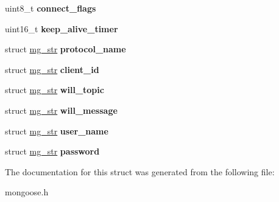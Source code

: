 \begin{DoxyCompactItemize}
uint8\+\_\+t {\bfseries connect\+\_\+flags}
\item 
\mbox{\label{structmg__mqtt__message_a79e6436df92ae92c88cd99150c27f8c7}} 
uint16\+\_\+t {\bfseries keep\+\_\+alive\+\_\+timer}
\item 
\mbox{\label{structmg__mqtt__message_ae908f614c1a210234df403fe9148d229}} 
struct \hyperlink{structmg__str}{mg\+\_\+str} {\bfseries protocol\+\_\+name}
\item 
\mbox{\label{structmg__mqtt__message_aa737e24d88a034c481cffdd207c6cb1a}} 
struct \hyperlink{structmg__str}{mg\+\_\+str} {\bfseries client\+\_\+id}
\item 
\mbox{\label{structmg__mqtt__message_a445cb051eb2301102a74561590614322}} 
struct \hyperlink{structmg__str}{mg\+\_\+str} {\bfseries will\+\_\+topic}
\item 
\mbox{\label{structmg__mqtt__message_abf358db60e5a092bd71a52a2dc9d02c7}} 
struct \hyperlink{structmg__str}{mg\+\_\+str} {\bfseries will\+\_\+message}
\item 
\mbox{\label{structmg__mqtt__message_a85ab9fb52ea0d8f353dcc09e285516c7}} 
struct \hyperlink{structmg__str}{mg\+\_\+str} {\bfseries user\+\_\+name}
\item 
\mbox{\label{structmg__mqtt__message_a9b8cee8acf7b16eed78f29b08d792229}} 
struct \hyperlink{structmg__str}{mg\+\_\+str} {\bfseries password}
\end{DoxyCompactItemize}


The documentation for this struct was generated from the following file\+:\begin{DoxyCompactItemize}
\item 
mongoose.\+h\end{DoxyCompactItemize}
